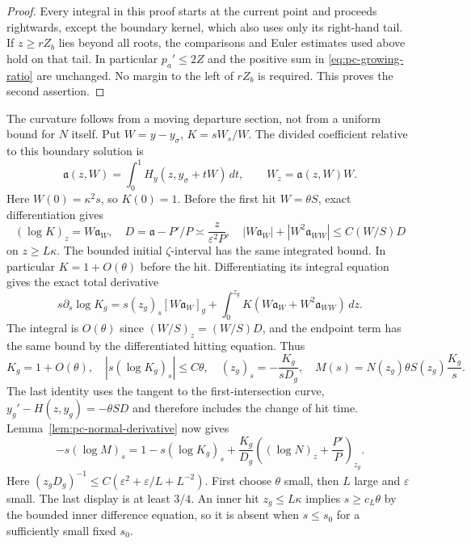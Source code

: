 \begin{proof}
Every integral in this proof starts at the current point and proceeds
rightwards, except the boundary kernel, which also uses only its
right-hand tail. If $z\ge rZ_b$ lies beyond all roots, the comparisons
and Euler estimates used above hold on that tail. In particular
$p_a'\le2Z$ and the positive sum in \eqref{eq:pc-growing-ratio} are
unchanged. No margin to the left of $rZ_b$ is required. This proves
the second assertion.
\end{proof}

The curvature follows from a moving departure section, not from a
uniform bound for $N$ itself. Put $W=y-y_\sigma$, $K=sW_s/W$.
The divided coefficient relative to this boundary solution is
\[
 \mathfrak a(z,W)=\int_0^1H_y(z,y_\sigma+tW)\,dt,
 \qquad W_z=\mathfrak a(z,W)W.
\]
Here $W(0)=\kappa^2s$, so $K(0)=1$.
Before the first hit $W=\theta S$, exact differentiation gives
\[
 (\log K)_z=W\mathfrak a_W,\quad
 D=\mathfrak a-P'/P\asymp\frac z{\varepsilon^2P},\quad
 |W\mathfrak a_W|+|W^2\mathfrak a_{WW}|\le C(W/S)D
\]
on $z\ge L\kappa$. The bounded initial $\zeta$-interval has the
same integrated bound. In particular $K=1+O(\theta)$ before the hit.
Differentiating its integral equation gives the exact total derivative
\[
 s\partial_s\log K_g
 =s(z_g)_s[W\mathfrak a_W]_g+
   \int_0^{z_g}K(W\mathfrak a_W+W^2\mathfrak a_{WW})\,dz.
\]
The integral is $O(\theta)$ since $(W/S)_z=(W/S)D$, and the endpoint term
has the same bound by the differentiated hitting equation. Thus
\begin{equation}
\label{eq:pc-gate-identities}
 K_g=1+O(\theta),\quad |s(\log K_g)_s|\le C\theta,\quad
 (z_g)_s=-\frac{K_g}{sD_g},\quad
 M(s)=N(z_g)\theta S(z_g)\frac{K_g}{s}.
\end{equation}
The last identity uses the tangent to the first-intersection curve,
$y_g'-H(z,y_g)=-\theta SD$ and therefore includes the change of
hit time. Lemma~\ref{lem:pc-normal-derivative} now gives
\[
 -s(\log M)_s
 =1-s(\log K_g)_s+
     \frac{K_g}{D_g}\left((\log N)_z+\frac{P'}P\right)_{z_g}.
\]
Here $(z_gD_g)^{-1}\le
C(\varepsilon^2+\varepsilon/L+L^{-2})$. First choose $\theta$ small,
then $L$ large and $\varepsilon$ small. The last display is at least
$3/4$.
An inner hit $z_g\le L\kappa$ implies $s\ge c_L\theta$ by the
bounded inner difference equation, so it is absent when $s\le s_0$
for a sufficiently small fixed $s_0$.

